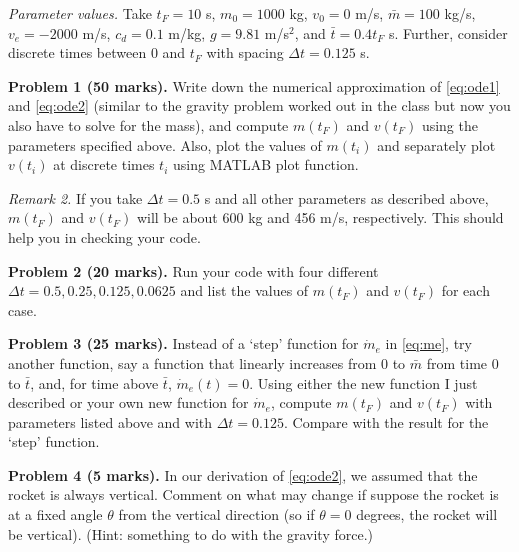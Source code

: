 \documentclass[12pt,a4paper]{report}
\begin{document}
\textit{Parameter values.} Take $t_F = 10$ s, $m_0 = 1000$ kg, $v_0 = 0$ m/s, $\bar{m} = 100$ kg/s, $v_e = -2000$ m/s, $c_d = 0.1$ m/kg, $g = 9.81$ m/s$^2$, and $\bar{t} = 0.4 t_F$ s. Further, consider discrete times between $0$ and $t_F$ with spacing $\Delta t = 0.125$ s. 

\vspace{10pt}

\textbf{Problem 1 (50 marks).} Write down the numerical approximation of \eqref{eq:ode1} and \eqref{eq:ode2} (similar to the gravity problem worked out in the class but now you also have to solve for the mass), and 
compute $m(t_F)$ and $v(t_F)$ using the parameters specified above. Also, plot the values of $m(t_i)$ and separately plot $v(t_i)$ at discrete times $t_i$ using MATLAB plot function. 

\vspace{10pt}
\textit{Remark 2.} If you take $\Delta t = 0.5$ s and all other parameters as described above, $m(t_F)$ and $v(t_F)$ will be about 600 kg and 456 m/s, respectively. This should help you in checking your code.

\vspace{10pt}
\textbf{Problem 2 (20 marks).} Run your code with four different $\Delta t = 0.5, 0.25, 0.125, 0.0625$ and list the values of $m(t_F)$ and $v(t_F)$ for each case. 

\vspace{10pt}
\textbf{Problem 3 (25 marks).} Instead of a `step' function for $\dot{m}_e$ in \eqref{eq:me}, try another function, say a function that linearly increases from $0$ to $\bar{m}$ from time $0$ to $\bar{t}$, and, for time above $\bar{t}$, $\dot{m}_e(t) = 0$. Using either the new function I just described or your own new function for $\dot{m}_e$, compute $m(t_F)$ and $v(t_F)$ with parameters listed above and with $\Delta t = 0.125$. Compare with the result for the `step' function.

\vspace{10pt}
\textbf{Problem 4 (5 marks).} In our derivation of \eqref{eq:ode2}, we assumed that the rocket is always vertical. Comment on what may change if suppose the rocket is at a fixed angle $\theta$ from the vertical direction (so if $\theta = 0$ degrees, the rocket will be vertical). (Hint: something to do with the gravity force.)
 
\end{document}
